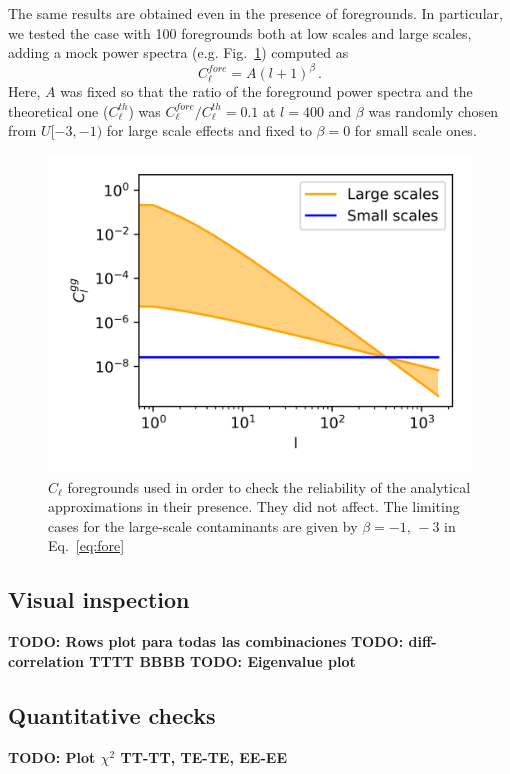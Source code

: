 \documentclass[a4paper,11pt]{article}
\newcommand{\todo}[1]{{\bf TODO: #1}}
\newcommand{\clth}{C_\ell^{th}}
\newcommand{\clf}{C_\ell^{fore}}
\newcommand{\cl}{C_\ell}
\begin{document}
The same results are obtained even in the presence of foregrounds. In
particular, we tested the case with 100 foregrounds both at low scales and
large scales, adding a mock power spectra (e.g. Fig.~\ref{fig:fore}) computed as 
\begin{equation}
  \clf = A (l + 1)^{\beta}\,.
  \label{eq:fore}
\end{equation}
Here, $A$ was fixed so that the ratio of the foreground power spectra and the
theoretical one ($\clth$) was $\clf/\clth = 0.1$ at $l=400$ and $\beta$ was
randomly chosen from $U[-3, -1)$ for large scale effects and fixed to $\beta =
0$ for small scale ones. 

\begin{figure}
  \centering
  \includegraphics[width=\columnwidth]{./figures/foreground.png}
  \caption{$\cl$ foregrounds used in order to check the reliability of the
    analytical approximations in their presence. They did not affect. The
    limiting cases for the large-scale contaminants are given by $\beta=-1,\,
    -3$ in Eq.~\ref{eq:fore}}
  \label{fig:fore}
\end{figure}

\subsection{Visual inspection}
\todo{Rows plot para todas las combinaciones}
\todo{diff-correlation TTTT BBBB}
\todo{Eigenvalue plot}

\subsection{Quantitative checks}
\todo{Plot $\chi^2$ TT-TT, TE-TE, EE-EE}
\end{document}
